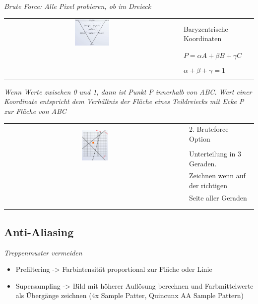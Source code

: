\textit{Brute Force: Alle Pixel probieren, ob im Dreieck}

\begin{tabular}{cl}
  \multirow{3}{*}{
      \includegraphics[width=0.2\textwidth]{assets/draw-baryzentrische-coordinates.png}
  } & \\
  & Baryzentrische Koordinaten \\
  & \\
  & $P = \alpha A + \beta B + \gamma C$\\
  & \\
  & $\alpha+\beta+\gamma =1$\\
  & \\
\end{tabular}

\textit{Wenn Werte zwischen 0 und 1, dann ist Punkt P innerhalb von ABC.
Wert einer Koordinate entspricht dem Verhältnis der Fläche eines Teildreiecks
mit Ecke P zur Fläche von ABC}\\

\begin{tabular}{cl}
  \multirow{3}{*}{
    \includegraphics[width=0.15\textwidth]{assets/draw-line-side.png}
  } & 2. Bruteforce Option \\
  & \\
  & Unterteilung in 3 Geraden. \\
  & Zeichnen wenn auf der richtigen\\
  & Seite aller Geraden \\
  & \\
  & \\
\end{tabular}

\subsection{Anti-Aliasing}
\textit{Treppenmuster vermeiden}
\begin{itemize}
	\item Prefiltering -> Farbintensität proportional zur Fläche oder Linie
  \item Supersampling -> Bild mit höherer Auflösung berechnen und Farbmittelwerte
    als Übergänge zeichnen (4x Sample Patter, Quincunx AA Sample Pattern)
\end{itemize}
